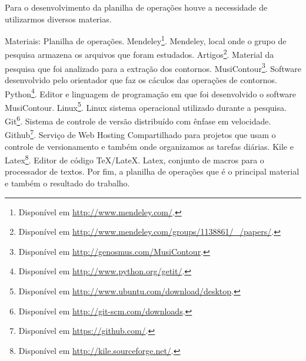\documentclass[11pt]{article}
\begin{document}

\label{sec:materiais}

Para o desenvolvimento da planilha de operações houve a necessidade de
utilizarmos diversos materias.


Materiais:
Planilha de operações.
Mendeley\footnote{Disponível em
  \url{http://www.mendeley.com/}.}. Mendeley, local onde o grupo de pesquisa
armazena os arquivos que foram estudados. 
Artigos\footnote{Disponível em
  \url{http://www.mendeley.com/groups/1138861/_/papers/}.}. Material da pesquisa
que foi analizado para a extração dos contornos.
MusiContour\footnote{Disponível em \url{http://genosmus.com/MusiContour}.}. Software 
desenvolvido pelo orientador que faz os cáculos das operações de contornos.
  Python\footnote{Disponível em  \url{http://www.python.org/getit/}.}. Editor e 
linguagem de programação em que foi desenvolvido o software MusiContour.
  Linux\footnote{Disponível em
  \url{http://www.ubuntu.com/download/desktop}.}. Linux sistema operacional utilizado 
  durante a pesquisa.
  Git\footnote{Disponível em
  \url{http://git-scm.com/downloads}.}. Sistema de controle de versão distribuído com 
ênfase em velocidade.
  Github\footnote{Disponível em
  \url{https://github.com/}.}. Serviço de Web Hosting Compartilhado para projetos que 
usam o controle de versionamento e também onde organizamos
as tarefas diárias.
  Kile e Latex\footnote{Disponível em
  \url{http://kile.sourceforge.net/}.}. Editor de código TeX/LateX. Latex, conjunto de macros 
  para o processador de textos.
  Por fim, a planilha de operações que é o principal material e também o resultado do trabalho.
\end{document}
